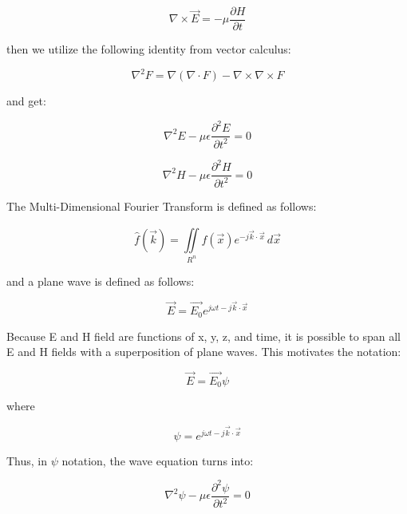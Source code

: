 \documentclass[12pt]{article}
\begin{document}
\begin{equation}
	\nabla \times \vec{E} = -\mu\frac{\partial H}{\partial t}
\end{equation}

then we utilize the following identity from vector calculus:

\begin{equation}
	\nabla^2F = \nabla(\nabla \cdot F) - \nabla\times\nabla\times F
\end{equation}

and get:

\begin{equation}
	\nabla^2E - \mu\epsilon\frac{\partial^2 E}{\partial t^2} = 0
\end{equation}

\begin{equation}
	\nabla^2H - \mu\epsilon\frac{\partial^2 H}{\partial t^2} = 0
\end{equation}

The Multi-Dimensional Fourier Transform is defined as follows:

\begin{equation}
	\hat{f} (\vec{k}) = \iint \limits_{R^n}^{} f(\vec{x})e^{-j \vec{k} \cdot \vec{x}} \,d\vec{x}
\end{equation}

and a plane wave is defined as follows:

\begin{equation}
	\vec{E} = \vec{E_{0}}e^{j \omega t - j\vec{k} \cdot \vec{x}}
\end{equation}

Because E and H field are functions of x, y, z, and time, it is possible to span all E and H fields with a superposition of plane waves. This motivates the notation:

\begin{equation}
	\vec{E} = \vec{E_{0}}\psi
\end{equation}

where

\begin{equation}
	\psi = e^{j \omega t - j\vec{k} \cdot \vec{x}}
\end{equation}

Thus, in \(\psi\) notation, the wave equation turns into:

\begin{equation}
	\nabla^2\psi - \mu\epsilon\frac{\partial^2\psi}{\partial t^2} = 0
\end{equation}
\end{document}
